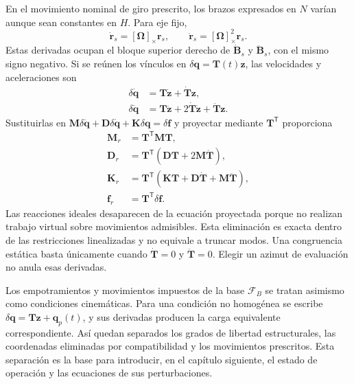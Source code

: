 \documentclass[11pt,a4paper,oneside]{report}
\newcommand{\vct}[1]{\bm{#1}}
\newcommand{\ten}[1]{\boldsymbol{#1}}
\newcommand{\tr}{\mathsf T}
\newcommand{\sk}[1]{[\bm{#1}]_{\times}}
\begin{document}
En el movimiento nominal de giro prescrito, los brazos expresados en $N$
varían aunque sean constantes en $H$. Para eje fijo,
\begin{equation}
 \dot{\vct r}_s=\sk{\Omega}\vct r_s,\qquad
 \ddot{\vct r}_s=\sk{\Omega}^{2}\vct r_s.
\end{equation}
Estas derivadas ocupan el bloque superior derecho de $\dot{\ten B}_s$ y
$\ddot{\ten B}_s$, con el mismo signo negativo. Si se reúnen los vínculos en
$\delta\vct q=\ten T(t)\vct z$, las velocidades y aceleraciones son
\begin{align}
 \delta\dot{\vct q}&=\ten T\dot{\vct z}+\dot{\ten T}\vct z,\\
 \delta\ddot{\vct q}&=\ten T\ddot{\vct z}
 +2\dot{\ten T}\dot{\vct z}+\ddot{\ten T}\vct z.
\end{align}
Sustituirlas en
$\ten M\delta\ddot{\vct q}+\ten D\delta\dot{\vct q}
+\ten K\delta\vct q=\delta\vct f$
y proyectar mediante $\ten T^{\tr}$ proporciona
\begin{align}
 \ten M_r&=\ten T^{\tr}\ten M\ten T,\\
 \ten D_r&=\ten T^{\tr}(\ten D\ten T+2\ten M\dot{\ten T}),\\
 \ten K_r&=\ten T^{\tr}(\ten K\ten T+\ten D\dot{\ten T}
 +\ten M\ddot{\ten T}),\\
 \vct f_r&=\ten T^{\tr}\delta\vct f.
 \label{eq:fe-reduccion-temporal}
\end{align}
Las reacciones ideales desaparecen de la ecuación proyectada porque no
realizan trabajo virtual sobre movimientos admisibles. Esta eliminación es
exacta dentro de las restricciones linealizadas y no equivale a truncar modos.
Una congruencia estática basta únicamente cuando $\dot{\ten T}=0$ y
$\ddot{\ten T}=0$. Elegir un azimut de evaluación no anula esas derivadas.

Los empotramientos y movimientos impuestos de la base $\mathcal F_B$ se
tratan asimismo como condiciones cinemáticas. Para una condición no homogénea
se escribe $\delta\vct q=\ten T\vct z+\vct q_p(t)$, y sus derivadas producen
la carga equivalente correspondiente. Así quedan separados los grados de
libertad estructurales, las coordenadas eliminadas por compatibilidad y los
movimientos prescritos. Esta separación es la base para introducir, en el
capítulo siguiente, el estado de operación y las ecuaciones de sus perturbaciones.
\end{document}
